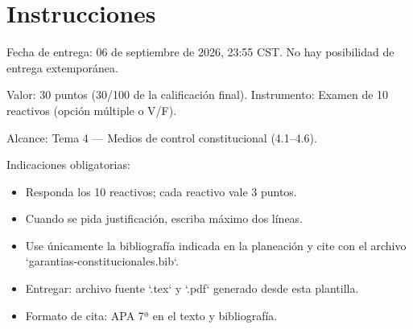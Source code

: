 \documentclass[
  spanish,
  letterpaper, oneside
]{article}
\providecommand{\insertcoverwatermark}{}%
\begin{document}
\insertcoverwatermark
\templatePortrait
\templatePagecfg
\onehalfspacing

\section{Instrucciones}

Fecha de entrega: 06 de septiembre de 2026, 23:55 CST. No hay posibilidad de entrega extemporánea.

Valor: 30 puntos (30/100 de la calificación final). Instrumento: Examen de 10 reactivos (opción múltiple o V/F).

Alcance: Tema 4 — Medios de control constitucional (4.1–4.6).

Indicaciones obligatorias:
\begin{itemize}
  \item Responda los 10 reactivos; cada reactivo vale 3 puntos.
  \item Cuando se pida justificación, escriba máximo dos líneas.
  \item Use únicamente la bibliografía indicada en la planeación y cite con el archivo `garantias-constitucionales.bib`.
  \item Entregar: archivo fuente `.tex` y `.pdf` generado desde esta plantilla.
  \item Formato de cita: APA 7ª en el texto y bibliografía.
\end{itemize}
\end{document}
